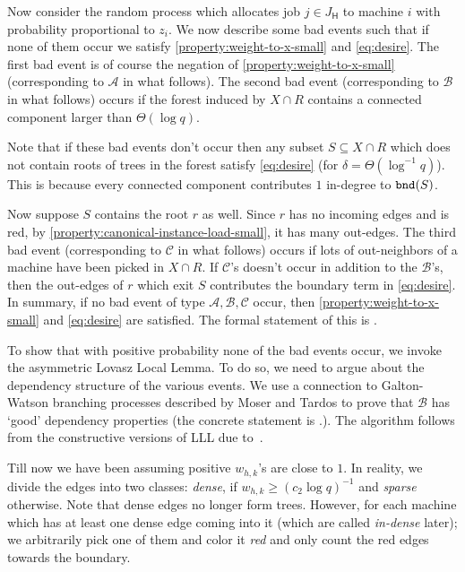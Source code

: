 \documentclass[11pt]{article}
\newcounter{prop}
\newcommand{\cA}{{\mathscr A}}
\newcommand{\cB}{\mathscr{B}}
\newcommand{\cC}{{\mathscr C}}
\newcommand{\sfH}{{\mathsf H}}
\begin{document}
Now consider the random process which allocates job $j\in J_\sfH$ to machine $i$ with probability proportional to $z_i$.  We now describe some bad events such that if none of them occur we satisfy   \ref{property:weight-to-x-small} and \ref{eq:desire}. The first bad event is of course the negation of \ref{property:weight-to-x-small} (corresponding to $\cA$ in what follows). The second  bad event (corresponding to $\cB$ in what follows) occurs if the forest induced by $X \cap R$ contains a connected component larger than $\Theta(\log q)$. 

Note that if these bad events don't occur then any subset $S\subseteq X \cap R$ which does not contain roots of trees in the forest satisfy \ref{eq:desire}   (for $\delta = \Theta(\log^{-1} q)$). This is because every connected component contributes $1$ in-degree to ${\tt bnd}(S)$. 

Now suppose $S$ contains the root $r$ as well. Since $r$ has no incoming edges and is red, by \ref{property:canonical-instance-load-small}, it has many out-edges. The third bad event (corresponding to $\cC$ in what follows) occurs if lots of out-neighbors of a machine have been picked in $X \cap R$. If $\cC$'s doesn't occur in addition to the $\cB$'s, then the out-edges of $r$ which exit $S$  contributes the boundary term in \ref{eq:desire}. In summary, if no bad event of type $\cA,\cB,\cC$ occur, then \ref{property:weight-to-x-small} and \ref{eq:desire} are satisfied. The formal statement of this is .

To show that with positive probability none of the bad events occur, we invoke the asymmetric  Lovasz Local Lemma. To do so, we need to argue about the dependency structure of the various events.  We use a connection  to Galton-Watson branching processes described by Moser and Tardos to prove that $\cB$ has `good' dependency properties (the concrete statement  is .). The algorithm follows from the constructive versions of LLL due to~\cite{MT10,HSS11}.

Till now we have been assuming positive $w_{h,k}$'s are close to $1$. In reality, we divide the edges into two classes: {\em dense}, if $w_{h,k} \geq (c_2\log q)^{-1}$ and {\em sparse} otherwise.  Note that dense edges no longer form trees. However, for each machine which has at least one dense edge coming into it (which are called {\em in-dense} later); we arbitrarily pick one of them and color it {\em red} and only count the red edges towards the boundary. 
\end{document}
